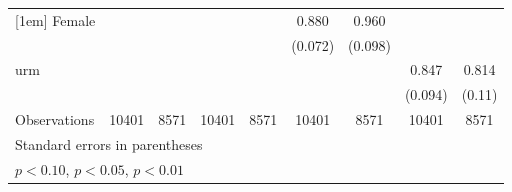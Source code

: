 \begin{table}[htbp]
\begin{tabular}{l*{8}{c}}
[1em]
Female              &                     &                     &                     &                     &       0.880\sym{***}&       0.960\sym{***}&                     &                     \\
                    &                     &                     &                     &                     &     (0.072)         &     (0.098)         &                     &                     \\
[1em]
urm                 &                     &                     &                     &                     &                     &                     &       0.847\sym{***}&       0.814\sym{***}\\
                    &                     &                     &                     &                     &                     &                     &     (0.094)         &      (0.11)         \\
\hline
Observations        &       10401         &        8571         &       10401         &        8571         &       10401         &        8571         &       10401         &        8571         \\
\hline\hline
\multicolumn{9}{l}{\footnotesize Standard errors in parentheses}\\
\multicolumn{9}{l}{\footnotesize \sym{*} \(p<0.10\), \sym{**} \(p<0.05\), \sym{***} \(p<0.01\)}\\
\end{tabular}
\end{table}
